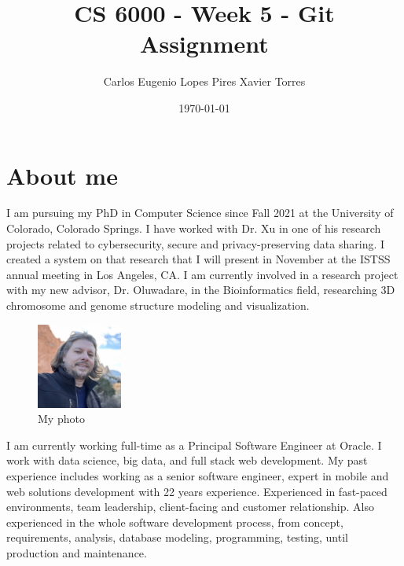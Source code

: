 
\newcommand{\myfullname}{Carlos Eugenio Lopes Pires Xavier Torres}
\newcommand{\myshortname}{Carlos E. Torres}

\title{CS 6000 - Week 5 - Git Assignment}
\author{\myfullname}
\date{\today}

% 

\maketitle

\section{About me}

I am pursuing my PhD in Computer Science since Fall 2021 at the University of Colorado, Colorado Springs. I have worked with Dr. Xu in one of his research projects related to cybersecurity, secure and privacy-preserving data sharing. I created a system on that research that I will present in November at the ISTSS annual meeting in Los Angeles, CA.
I am currently involved in a research project with my new advisor, Dr. Oluwadare, in the Bioinformatics field, researching 3D chromosome and genome structure modeling and visualization.

\begin{figure}
    \centering
    \includegraphics[width=0.25\textwidth]{Torres-F23-photo.jpg}
    \caption{\small My photo}
\end{figure}

I am currently working full-time as a Principal Software Engineer at Oracle. I work with data science, big data, and full stack web development. My past experience includes working as a senior software engineer, expert in mobile and web solutions development with 22 years experience. Experienced in fast-paced environments, team leadership, client-facing and customer relationship. Also experienced in the whole software development process, from concept, requirements, analysis, database modeling, programming, testing, until production and maintenance.

